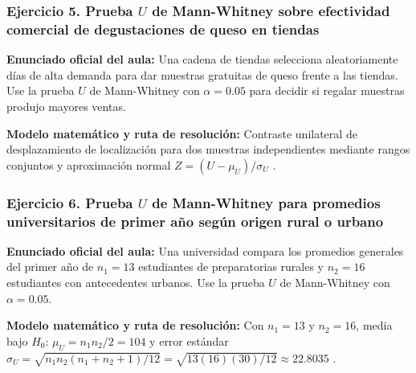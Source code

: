 {\subsubsection*{Ejercicio 5. Prueba $U$ de Mann-Whitney sobre efectividad comercial de degustaciones de queso en tiendas}
\textbf{Enunciado oficial del aula:} Una cadena de tiendas selecciona aleatoriamente días de alta demanda para dar muestras gratuitas de queso frente a las tiendas. Use la prueba $U$ de Mann-Whitney con $\alpha = 0.05$ para decidir si regalar muestras produjo mayores ventas.

\textbf{Modelo matemático y ruta de resolución:} Contraste unilateral de desplazamiento de localización para dos muestras independientes mediante rangos conjuntos y aproximación normal $Z = (U - \mu_U)/\sigma_U$ \citep{levin2004}.

\subsubsection*{Ejercicio 6. Prueba $U$ de Mann-Whitney para promedios universitarios de primer año según origen rural o urbano}
\textbf{Enunciado oficial del aula:} Una universidad compara los promedios generales del primer año de $n_1 = 13$ estudiantes de preparatorias rurales y $n_2 = 16$ estudiantes con antecedentes urbanos. Use la prueba $U$ de Mann-Whitney con $\alpha = 0.05$.

\textbf{Modelo matemático y ruta de resolución:} Con $n_1 = 13$ y $n_2 = 16$, media bajo $H_0$: $\mu_U = n_1 n_2 / 2 = 104$ y error estándar $\sigma_U = \sqrt{n_1 n_2(n_1+n_2+1)/12} = \sqrt{13(16)(30)/12} \approx 22.8035$ \citep{levin2004}.


}
